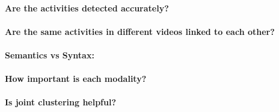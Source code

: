 \paragraph{Are the activities detected accurately?}
\paragraph{Are the same activities in different videos linked to each other?}
\paragraph{Semantics vs Syntax:}
\paragraph{How important is each modality?}
\paragraph{Is joint clustering helpful?}
